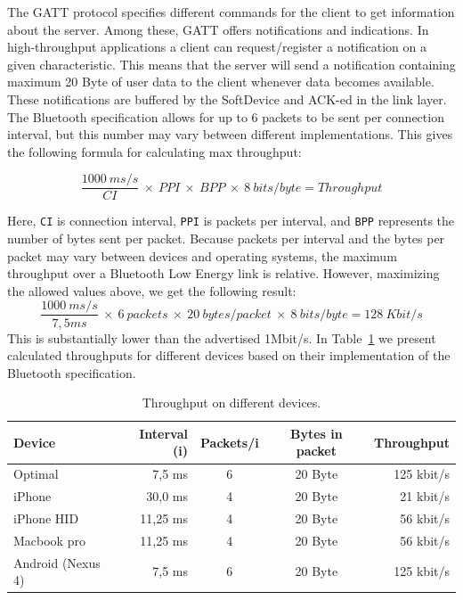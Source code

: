 The GATT protocol specifies different commands for the client to get information about the server. Among these, GATT offers notifications and indications. In high-throughput applications a client can request/register a notification on a given characteristic. This means that the server will send a notification containing maximum 20 Byte of user data to the client whenever data becomes available. These notifications are buffered by the SoftDevice and ACK-ed in the link layer. The Bluetooth specification allows for up to 6 packets to be sent per connection interval, but this number may vary between different implementations. This gives the following formula for calculating max throughput:

\[
\frac{1000\: ms/s}{CI}\: \times\: PPI\: \times\: BPP\: \times\: 8\: bits/byte = Throughput
\]

\newline
\noindent
Here, \texttt{CI} is connection interval, \texttt{PPI} is packets per interval, and \texttt{BPP} represents the number of bytes sent per packet. Because packets per interval and the bytes per packet may vary between devices and operating systems, the maximum throughput over a Bluetooth Low Energy link is relative. However, maximizing the allowed values above, we get the following result: 
\[
\frac{1000\: ms/s}{7,5ms}\: \times\: 6\: packets\: \times\: 20\:bytes/packet\: \times\: 8\: bits/byte = 128\:Kbit/s
\]
\newline
\noindent
This is substantially lower than the advertised 1Mbit/s. In Table~\ref{tab:ble_device_throughput} we present calculated throughputs for different devices based on their implementation of the Bluetooth specification.

\begin{table}[]
\centering
\caption{Throughput on different devices.}
\label{tab:ble_device_throughput}
\begin{tabular}{@{}lrccr@{}}
\toprule
\textbf{Device}   & \textbf{Interval (i)} & \textbf{Packets/i} & \textbf{Bytes in packet} & \textbf{Throughput} \\ \midrule
Optimal	          & 7,5 ms	  & 6	  & 20 Byte	  & 125 kbit/s \\
iPhone	          & 30,0 ms	  & 4	  & 20 Byte	  & 21 kbit/s   \\
iPhone HID	      & 11,25 ms	& 4	  & 20 Byte	  & 56 kbit/s \\
Macbook pro	      & 11,25 ms	& 4	  & 20 Byte	  & 56 kbit/s \\
Android (Nexus 4)	& 7,5 ms	  & 6	  & 20 Byte	  & 125 kbit/s  \\ \bottomrule
\end{tabular}
\end{table}


